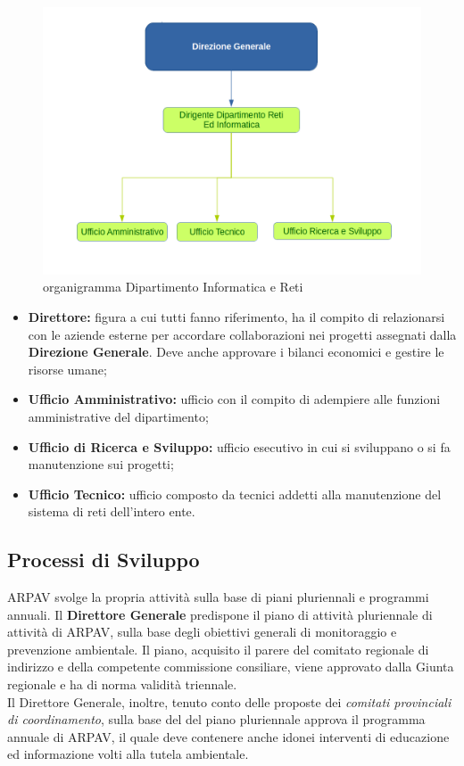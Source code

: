\begin{figure}[htbp]
	\centering
	\includegraphics[scale=0.4]{./capitoli/capitolo1/img/organigrammaDip}
	\caption{organigramma Dipartimento Informatica e Reti}
\end{figure}

\begin{itemize}

	\item \textbf{Direttore:} figura a cui tutti fanno riferimento, ha il compito di relazionarsi con le aziende esterne per accordare collaborazioni nei progetti assegnati dalla \textbf{Direzione Generale}. Deve anche approvare i bilanci economici e gestire le risorse umane;
	\item \textbf{Ufficio Amministrativo:} ufficio con il compito di adempiere alle funzioni amministrative del dipartimento;
	\item \textbf{Ufficio di Ricerca e Sviluppo:} ufficio esecutivo in cui si sviluppano o si fa manutenzione sui progetti;
	\item \textbf{Ufficio Tecnico:} ufficio composto da tecnici addetti alla manutenzione del sistema di reti dell'intero ente.
	
\end{itemize}
\subsection{Processi di Sviluppo}

ARPAV svolge la propria attività sulla base di piani pluriennali e programmi annuali. Il \textbf{Direttore Generale} predispone il piano di attività pluriennale di attività di ARPAV, sulla base degli obiettivi generali di monitoraggio e prevenzione ambientale. Il piano, acquisito il parere del comitato regionale di indirizzo e della competente commissione consiliare, viene approvato dalla Giunta regionale e ha di norma validità triennale. \\
Il Direttore Generale, inoltre, tenuto conto delle proposte dei \textit{comitati provinciali di coordinamento}, sulla base del del piano pluriennale approva il programma annuale di ARPAV, il quale deve contenere anche idonei interventi di educazione ed informazione volti alla tutela ambientale.

